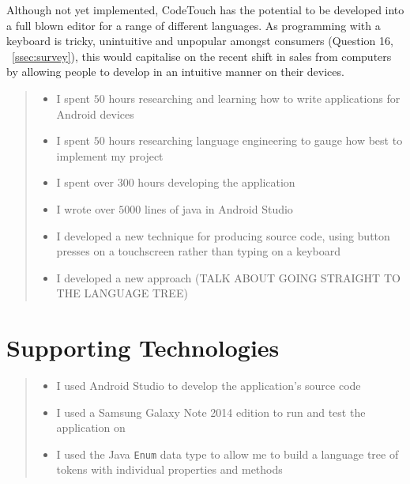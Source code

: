 \documentclass[ %
                    author={Jonathan Rankin},
                supervisor={Dr. David May, Dr. Ian Holyer},
                    degree={MEng},
                     title={CodeTouch},
                  subtitle={A Revolutionary Way To Program Real Code On Touch Screen Devices},
                      type={enterprise},
                      year={2015 } ]{dissertation}
\begin{document}
Although not yet implemented, CodeTouch has the potential to be developed into a full blown editor for a range of different languages. As programming with a keyboard is tricky, unintuitive and unpopular amongst consumers (Question 16, ~\ref{ssec:survey}), this would capitalise on the recent shift in sales from computers by allowing people to develop in an intuitive manner on their devices.



\begin{quote}
\noindent
\begin{itemize}
\item I spent $50$ hours researching and learning how to write applications for Android devices
\item I spent $50$ hours researching language engineering to gauge how best to implement my project
\item I spent over $300$ hours developing the application
\item I wrote over $5000$ lines of java in Android Studio
\item I developed a new technique for producing source code, using button presses on a touchscreen rather than typing on a keyboard 
\item I developed a new approach (TALK ABOUT GOING STRAIGHT TO THE LANGUAGE TREE)

\end{itemize}
\end{quote}



\chapter*{Supporting Technologies}


\vspace{1cm} 


\begin{quote}
\begin{itemize}
\item I used Android Studio \cite{AndroidStudio} to develop the application's source code
\item I used a Samsung Galaxy Note 2014 edition to run and test the application on \cite{GalaxyNote}
\item I used the Java {\tt Enum} data type to allow me to build a language tree of tokens with individual properties and methods
\end{itemize}
\end{quote}
\end{document}

